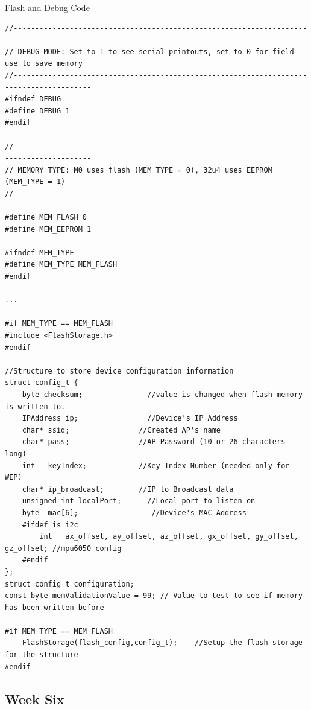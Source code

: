 \documentclass[onecolumn, draftclsnofoot,10pt, compsoc]{IEEEtran}
\begin{document}
    \begin{listing}[H]    
        \caption{Flash and Debug Code}  
        \label{lst:flash_and_debug}    


\begin{verbatim}
//----------------------------------------------------------------------------------------
// DEBUG MODE: Set to 1 to see serial printouts, set to 0 for field use to save memory
//----------------------------------------------------------------------------------------
#ifndef DEBUG
#define DEBUG 1
#endif

//----------------------------------------------------------------------------------------
// MEMORY TYPE: M0 uses flash (MEM_TYPE = 0), 32u4 uses EEPROM (MEM_TYPE = 1)
//----------------------------------------------------------------------------------------
#define MEM_FLASH 0
#define MEM_EEPROM 1

#ifndef MEM_TYPE
#define MEM_TYPE MEM_FLASH
#endif  

...

#if MEM_TYPE == MEM_FLASH
#include <FlashStorage.h>
#endif 

//Structure to store device configuration information
struct config_t {
    byte checksum;               //value is changed when flash memory is written to.
    IPAddress ip;                //Device's IP Address
    char* ssid;                //Created AP's name
    char* pass;                //AP Password (10 or 26 characters long)
    int   keyIndex;            //Key Index Number (needed only for WEP)
    char* ip_broadcast;        //IP to Broadcast data
    unsigned int localPort;      //Local port to listen on
    byte  mac[6];                 //Device's MAC Address
    #ifdef is_i2c
        int   ax_offset, ay_offset, az_offset, gx_offset, gy_offset, gz_offset; //mpu6050 config
    #endif
};
struct config_t configuration;
const byte memValidationValue = 99; // Value to test to see if memory has been written before

#if MEM_TYPE == MEM_FLASH
    FlashStorage(flash_config,config_t);    //Setup the flash storage for the structure
#endif
\end{verbatim}
\end{listing}



\subsection{Week Six}
\end{document}
